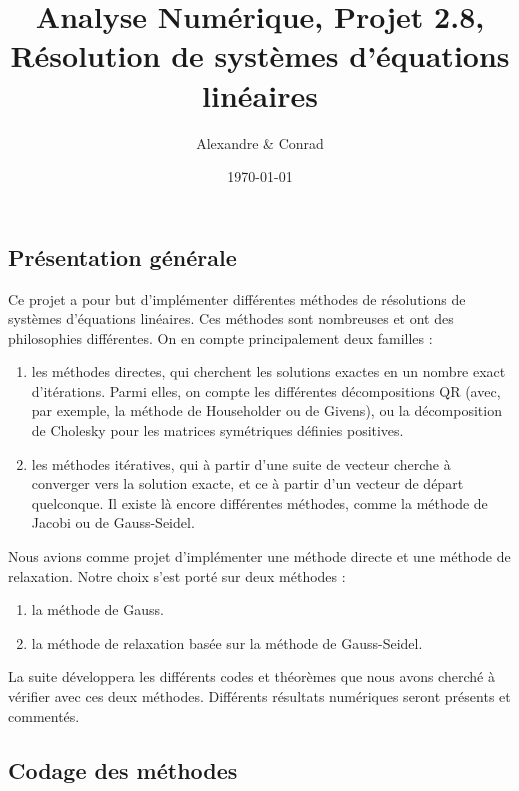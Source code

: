 \documentclass{article}
\author{Alexandre \bsc{Vieira} \& Conrad \bsc{Hillairet}}
\title{Analyse Numérique, Projet 2.8, \\ Résolution de systèmes d'équations linéaires}
\date{\today}
\theoremstyle{mes_theoremes}
\begin{document}
	
\maketitle
\newpage

\setcounter{tocdepth}{0}
\tableofcontents

\newpage

\textcolor{or}{\part*{Présentation générale}}
Ce projet a pour but d'implémenter différentes méthodes de résolutions de systèmes d'équations linéaires. Ces méthodes sont nombreuses et ont des philosophies différentes. On en compte principalement deux familles : 
\begin{enumerate}
\item les méthodes directes, qui cherchent les solutions exactes en un nombre exact d'itérations. Parmi elles, on compte les différentes décompositions QR (avec, par exemple, la méthode de Householder ou de Givens), ou la décomposition de Cholesky pour les matrices symétriques définies positives.
\item les méthodes itératives, qui à partir d'une suite de vecteur cherche à converger vers la solution exacte, et ce à partir d'un vecteur de départ quelconque. Il existe là encore différentes méthodes, comme la méthode de Jacobi ou de Gauss-Seidel. 
\end{enumerate}

\bigskip
Nous avions comme projet d'implémenter une méthode directe et une méthode de relaxation. Notre choix s'est porté sur deux méthodes :
\begin{enumerate}
\item la méthode de Gauss.
\item la méthode de relaxation basée sur la méthode de Gauss-Seidel.
\end{enumerate}

\bigskip
La suite développera les différents codes et théorèmes que nous avons cherché à vérifier avec ces deux méthodes. Différents résultats numériques seront présents et commentés.
\newpage

\textcolor{or}{\part*{Codage des méthodes}}
\end{document}

